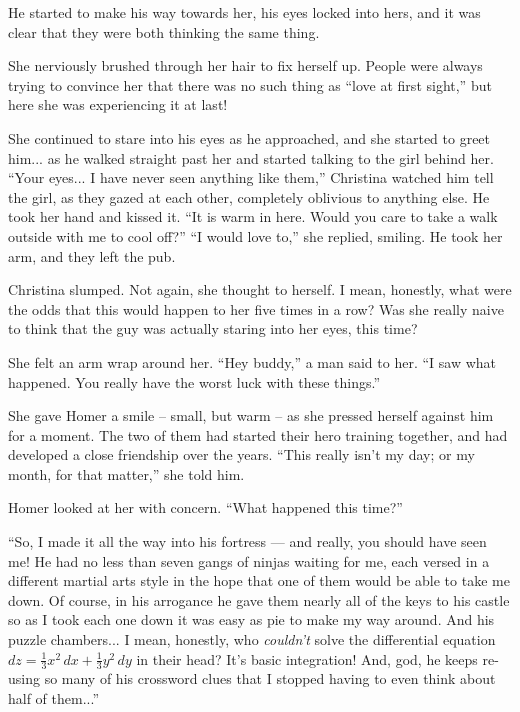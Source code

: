 \documentclass[showtrims,b6paper,draft,10pt]{memoir}
\begin{document}
He started to make his way towards her, his eyes locked into hers, and it was clear that they were both thinking the same thing.

She nerviously brushed through her hair to fix herself up.  People were always trying to convince her that there was no such thing as ``love at first sight,'' but here she was experiencing it at last!

She continued to stare into his eyes as he approached, and she started to greet him... as he walked straight past her and started talking to the girl behind her.  ``Your eyes... I have never seen anything like them,''  Christina watched him tell the girl, as they gazed at each other, completely oblivious to anything else.  He took her hand and kissed it.  ``It is warm in here.  Would you care to take a walk outside with me to cool off?''  ``I would love to,'' she replied, smiling.  He took her arm, and they left the pub.

Christina slumped.  Not again, she thought to herself.  I mean, honestly, what were the odds that this would happen to her five times in a row?  Was she really naive to think that the guy was actually staring into her eyes, this time?

She felt an arm wrap around her.  ``Hey buddy,'' a man said to her.  ``I saw what happened.  You really have the worst luck with these things.''

She gave Homer a smile -- small, but warm -- as she pressed herself against him for a moment.  The two of them had started their hero training together, and had developed a close friendship over the years.  ``This really isn't my day;  or my month, for that matter,'' she told him.

Homer looked at her with concern.  ``What happened this time?''

``So, I made it all the way into his fortress --- and really, you should have seen me!  He had no less than seven gangs of ninjas waiting for me, each versed in a different martial arts style in the hope that one of them would be able to take me down.  Of course, in his arrogance he gave them nearly all of the keys to his castle so as I took each one down it was easy as pie to make my way around.  And his puzzle chambers... I mean, honestly, who \emph{couldn't} solve the differential equation $dz=\frac{1}{3}x^2\,dx+\frac{1}{3}y^2\,dy$ in their head?  It's basic integration!  And, god, he keeps re-using so many of his crossword clues that I stopped having to even think about half of them...''
\end{document}
